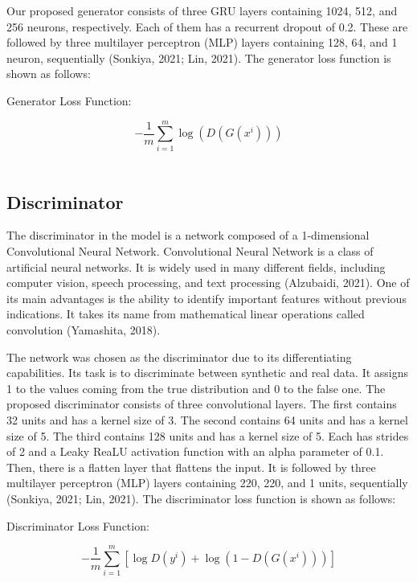 \documentclass[review]{elsarticle} %
\begin{document}
Our proposed generator consists of three GRU layers containing 1024, 512, and 256 neurons, respectively. Each of them has a recurrent dropout of 0.2. These are followed by three multilayer perceptron (MLP) layers containing 128, 64, and 1 neuron, sequentially (Sonkiya, 2021; Lin, 2021). 
The generator loss function is shown as follows: 

\begin{center}   Generator Loss Function:  \end{center}
\begin{equation}
-\frac{1}{m} \sum_{i=1}^{m} \log \left(D\left(G\left(x^{i}\right)\right)\right)
\end{equation}\\

\subsection{Discriminator}

The discriminator in the model is a network composed of a 1-dimensional Convolutional Neural Network. 
Convolutional Neural Network is a class of artificial neural networks. It is widely used in many different fields, including computer vision, speech processing, and text processing (Alzubaidi, 2021). One of its main advantages is the ability to identify important features without previous indications. It takes its name from mathematical linear operations called convolution (Yamashita, 2018).

The network was chosen as the discriminator due to its differentiating capabilities. Its task is to discriminate between synthetic and real data. It assigns 1 to the values coming from the true distribution and 0 to the false one. 
The proposed discriminator consists of three convolutional layers. The first contains 32 units and has a kernel size of 3. The second contains 64 units and has a kernel size of 5. The third contains 128 units and has a kernel size of 5. Each has strides of 2 and a Leaky ReaLU activation function with an alpha parameter of 0.1. Then, there is a flatten layer that flattens the input. It is followed by three multilayer perceptron (MLP) layers containing 220, 220, and 1 units, sequentially (Sonkiya, 2021; Lin, 2021). 
The discriminator loss function is shown as follows: 
\begin{center}  Discriminator Loss Function: \end{center}
\begin{equation}
-\frac{1}{m} \sum_{i=1}^{m}\left[\log D\left(y^{i}\right)+\log \left(1-D\left(G\left(x^{i}\right)\right)\right)\right]
\end{equation}
\end{document}
